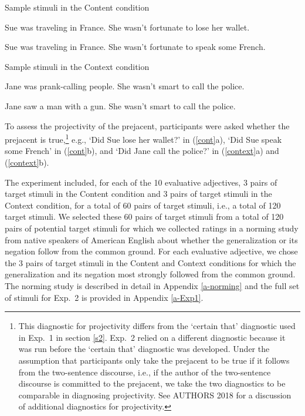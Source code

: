 \documentclass[11pt,fleqn]{article}
\newcommand{\6}{\mbox{$[\hspace*{-.6mm}[$}}
\newcommand{\9}{\mbox{$]\hspace*{-.6mm}]$}}
\begin{document}
\begin{exe}
\ex\label{cont} Sample stimuli in the Content condition 

\begin{xlist}
\ex Sue was traveling in France. She wasn't fortunate to lose her wallet.  

\ex Sue was traveling in France. She wasn't fortunate to speak some French.
\end{xlist}

\ex\label{context} Sample stimuli in the Context condition

\begin{xlist}
\ex Jane was prank-calling people. She wasn't smart to call the police. 

\ex Jane saw a man with a gun. She wasn't smart to call the police. 
\end{xlist}
\end{exe}
To assess the projectivity of the prejacent, participants were asked whether the prejacent is true,\footnote{This diagnostic for projectivity differs from the `certain that' diagnostic used in Exp.~1 in section \ref{s2}. Exp.~2 relied on a different diagnostic because it was run before the `certain that' diagnostic was developed. Under the assumption that participants only take the prejacent to be true if it follows from the two-sentence discourse, i.e., if the author of the two-sentence discourse is committed to the prejacent, we take the two diagnostics to be comparable in diagnosing projectivity. See AUTHORS 2018 for a discussion of additional diagnostics for projectivity.} e.g., `Did Sue lose her wallet?' in (\ref{cont}a), `Did Sue speak some French' in (\ref{cont}b), and `Did Jane call the police?' in (\ref{context}a) and (\ref{context}b).

The experiment included, for each of the 10 evaluative adjectives, 3 pairs of target stimuli in the Content condition and 3 pairs of target stimuli in the Context condition, for a total of 60 pairs of target stimuli, i.e., a total of 120 target stimuli. We selected these 60 pairs of target stimuli from a total of 120 pairs of potential target stimuli for which we collected ratings in a norming study from native speakers of American English about whether the generalization or its negation follow from the common ground. For each evaluative adjective, we chose the 3 pairs of target stimuli in the Content and Context conditions for which the generalization and its negation most strongly followed from the common ground. The norming study is described in detail in Appendix \ref{a-norming} and the full set of stimuli for Exp.~2 is provided in Appendix \ref{a-Exp1}.
\end{document}
